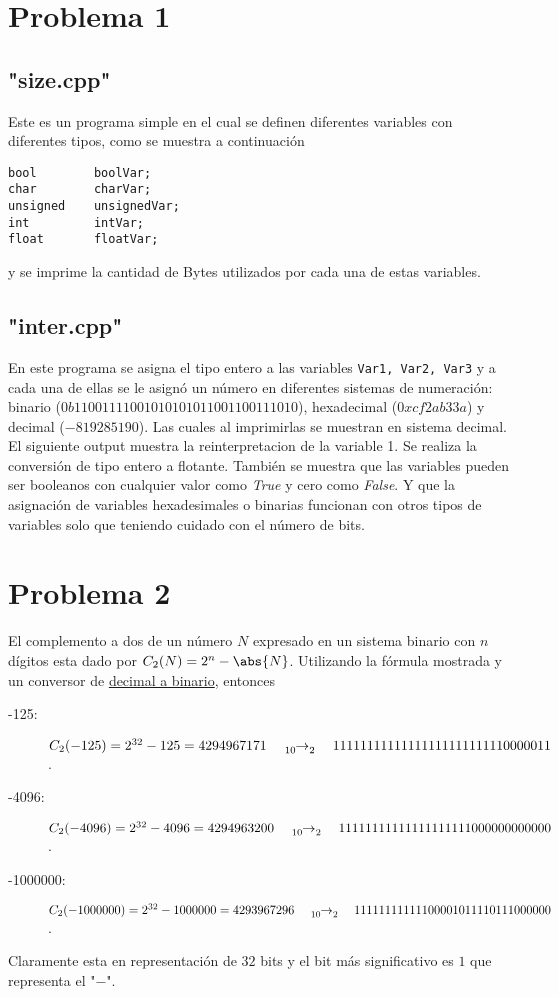 \vspace{0.5cm}

\section*{Problema 1}
\subsection*{"size.cpp"}
Este es un programa simple en el cual se definen diferentes variables con diferentes tipos, como se muestra a continuación
\begin{lstlisting}
bool        boolVar;
char        charVar;
unsigned    unsignedVar;
int         intVar;
float       floatVar;
\end{lstlisting}
y se imprime la cantidad de Bytes utilizados por cada una de estas variables.

\subsection*{"inter.cpp"}
En este programa se asigna el tipo entero a las variables \texttt{Var1, Var2, Var3} y a cada una de ellas se le asignó un número en diferentes sistemas de numeración: binario ($0b11001111001010101011001100111010$), hexadecimal ($0xcf2ab33a$) y decimal ($-819285190$). Las cuales al imprimirlas se muestran en sistema decimal. El siguiente output muestra la reinterpretacion de la variable 1. Se realiza la conversión de tipo entero a flotante. También se muestra que las variables pueden ser booleanos con cualquier valor como \textit{True} y cero como \textit{False}. Y que  la asignación de variables hexadesimales o binarias funcionan con otros tipos de variables solo que teniendo cuidado con el número de bits.

\section*{Problema 2}
El complemento a dos de un número $N$ expresado en un sistema binario con $n$ dígitos esta dado por $C_2 (N) = 2^n - \abs{N}$. Utilizando la fórmula mostrada y un conversor de \href{https://www.rapidtables.org/convert/number/decimal-to-binary.html}{decimal a binario}, entonces
\begin{description}
	\item[-125: ] $C_2 (-125) = 2^{32} - 125 = 4294967171 \quad \tensor[_{10}]{\rightarrow}{_{2}} \quad 11111111111111111111111110000011$.
	\item[-4096: ] $C_2 (-4096) = 2^{32} - 4096 = 4294963200 \quad \tensor[_{10}]{\rightarrow}{_{2}} \quad 11111111111111111111000000000000$.
	\item[-1000000: ] $C_2 (-1000000) = 2^{32} - 1000000 = 4293967296 \quad \tensor[_{10}]{\rightarrow}{_{2}} \quad 11111111111100001011110111000000$.
\end{description}
Claramente esta en representación de $32$ bits y el bit más significativo es $1$ que representa el "$-$".
